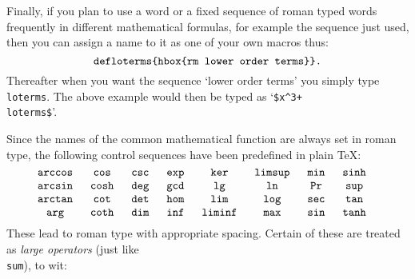 Finally, if you plan to use a word or a fixed sequence of roman typed words
frequently in different mathematical formulas, for example the sequence just
used, then you can assign a name to it as one of your own macros thus:
$$\hbox{\tt \\def\\loterms\lbr \\hbox\lbr \\rm lower order terms\rrbr.}$$
Thereafter when you want the sequence `lower order terms' you simply type
{\tt \\loterms}. The above example would then be typed as \quad
`{\tt \$x\^{}3+\\loterms\$}'.

Since the names of the common mathematical function are always set in
roman type, the following control sequences have been predefined in plain
\TeX:
$$\vbox{\tt \halign{#\hfil\quad&&#\hfil\quad\cr
\\arccos  &\\cos   &\\csc   &\\exp   &\\ker     &\\limsup  &\\min  &\\sinh\cr
\\arcsin  &\\cosh  &\\deg   &\\gcd   &\\lg      &\\ln      &\\Pr   &\\sup\cr
\\arctan  &\\cot   &\\det   &\\hom   &\\lim     &\\log     &\\sec  &\\tan\cr
\\arg     &\\coth  &\\dim   &\\inf   &\\liminf  &\\max     &\\sin  &\\tanh\cr
}}$$
These \css\/ lead to roman type with appropriate spacing.
Certain of these are treated as {\sl large operators} (just like {\tt \\sum}), to wit:
